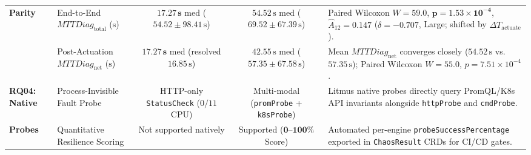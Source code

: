 \begin{table}[!tbp]
\begin{tabularx}{\textwidth}{p{2.2cm} p{2.9cm} c c X}
\textbf{Parity} & End-to-End $MTTDiag_{\text{total}}$ ($\text{s}$) & $\mathbf{17.27\,\text{s}}$ med ($54.52 \pm 98.41\,\text{s}$) & $54.52\,\text{s}$ med ($69.52 \pm 67.39\,\text{s}$) & Paired Wilcoxon $W = 59.0$, $\mathbf{p = 1.53 \times 10^{-4}}$, $\hat{A}_{12} = 0.147$ ($\delta = -0.707$, Large; shifted by $\Delta T_{\text{actuate}}$). \\
& Post-Actuation $MTTDiag_{\text{net}}$ ($\text{s}$) & $\mathbf{17.27\,\text{s}}$ med (resolved $16.85\,\text{s}$) & $42.55\,\text{s}$ med ($57.35 \pm 67.58\,\text{s}$) & Mean $MTTDiag_{\text{net}}$ converges closely ($54.52\,\text{s}$ vs.\ $57.35\,\text{s}$); Paired Wilcoxon $W = 55.0$, $p = 7.51 \times 10^{-4}$. \\
\midrule
\textbf{RQ04: Native} & Process-Invisible Fault Probe & HTTP-only \texttt{StatusCheck} ($0/11$ CPU) & Multi-modal (\texttt{promProbe} + \texttt{k8sProbe}) & Litmus native probes directly query PromQL/K8s API invariants alongside \texttt{httpProbe} and \texttt{cmdProbe}. \\
\textbf{Probes} & Quantitative Resilience Scoring & Not supported natively & Supported ($\mathbf{0\text{--}100\%}$ Score) & Automated per-engine \texttt{probeSuccessPercentage} exported in \texttt{ChaosResult} CRDs for CI/CD gates. \\
\bottomrule
\end{tabularx}
\end{table}